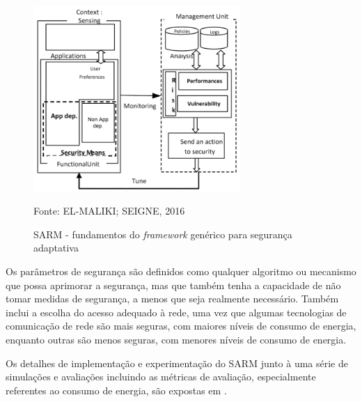 \documentclass[tid,table]{texufpel} %
\begin{document}
\begin{figure}[ht]
\centering
\includegraphics[width=0.7\textwidth]{imagens/sarm-framework.png}
\caption{SARM - fundamentos do \textit{framework} genérico para segurança adaptativa}
\label{sarm-framework}
Fonte: EL-MALIKI; SEIGNE, 2016
\end{figure}

Os parâmetros de segurança são definidos como qualquer algoritmo ou mecanismo que possa aprimorar a segurança, mas que também tenha a capacidade de não tomar medidas de segurança, a menos que seja realmente necessário. Também inclui a escolha do acesso adequado à rede, uma vez que algumas tecnologias de comunicação de rede são mais seguras, com maiores níveis de consumo de energia, enquanto outras são menos seguras, com menores níveis de consumo de energia.

Os detalhes de implementação e experimentação do SARM junto à uma série de simulações e avaliações incluindo as métricas de avaliação, especialmente referentes ao consumo de energia, são expostas em \cite{elmaliki14}.


\end{document}
